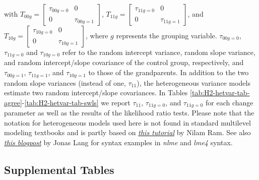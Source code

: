 \documentclass[
  english,
  man,floatsintext]{apa7}
\begin{document}
with \(T_{00g}=\begin{bmatrix} \tau_{00g=0} & 0\\ 0 & \tau_{00g=1}\end{bmatrix}\),
\(T_{11g}=\begin{bmatrix} \tau_{11g=0} & 0\\ 0 & \tau_{11g=1}\end{bmatrix}\),
and \(T_{10g}=\begin{bmatrix} \tau_{10g=0} & 0\\ 0 & \tau_{10g=1}\end{bmatrix}\),
where \(g\) represents the grouping variable. \(\tau_{00g=0}\), \(\tau_{11g=0}\) and \(\tau_{10g=0}\) refer to the random intercept variance, random slope variance, and random intercept/slope covariance of the control group, respectively, and \(\tau_{00g=1}\), \(\tau_{11g=1}\), and \(\tau_{10g=1}\) to those of the grandparents. In addition to the two random slope variances (instead of one, \(\tau_{11}\)), the heterogeneous variance models estimate two random intercept/slope covariances. In Tables \ref{tab:H2-hetvar-tab-agree}-\ref{tab:H2-hetvar-tab-swls} we report \(\tau_{11}\), \(\tau_{11g=0}\), and \(\tau_{11g=0}\) for each change parameter as well as the results of the likelihood ratio tests. Please note that the notation for heterogeneous models used here is not found in standard multilevel modeling textbooks and is partly based on \href{https://quantdev.ssri.psu.edu/sites/qdev/files/ILD_Ch06_2017_MLMwithHeterogeneousVariance.html}{\emph{this tutorial}} by Nilam Ram. See also \href{http://jonaslang.info/index.php?y=1548295404}{\emph{this blogpost}} by Jonas Lang for syntax examples in \emph{nlme} and \emph{lme4} syntax.\\
\newpage

\hypertarget{supplemental-tables}{%
\subsection{Supplemental Tables}\label{supplemental-tables}}
\end{document}
